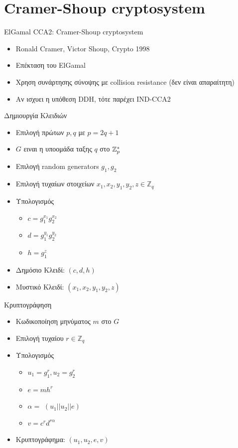 \documentclass[handout]{beamer}
\begin{document}
\section{Cramer-Shoup cryptosystem}
\begin{frame}[allowframebreaks]{ElGamal CCA2: Cramer-Shoup cryptosystem}
\begin{itemize}
\item Ronald Cramer, Victor Shoup, Crypto 1998
\item Επέκταση του ElGamal
\item Χρηση συνάρτησης σύνοψης \hash με collision resistance  (δεν είναι απαραίτητη)
\item Αν ισχυει η υπόθεση DDH, τότε παρέχει IND-CCA2
\end{itemize}

\begin{block}{Δημιουργία Κλειδιών}
\begin{itemize}
\item Επιλογή πρώτων $p,q$ με $p=2q+1$
\item $G$ ειναι η υποομάδα ταξης $q$ στο $\mathbb{Z}^*_p$
\item Επιλογή random generators $g_1, g_2$

\item Επιλογή τυχαίων στοιχείων $x_1,x_2,y_1,y_2,z \in \mathbb{Z}_{q}$
\item Υπολογισμός
\begin{itemize} 
\item $c=g_1^{x_1}g_2^{x_2}$
\item $d=g_1^{y_1}g_2^{y_2}$
\item $h=g_1^{z}$
\end{itemize}
\item Δημόσιο Κλειδί: $(c,d,h)$
\item Μυστικό Κλειδί: $(x_1,x_2,y_1,y_2,z)$
\end{itemize}
\end{block}

\framebreak

\begin{block}{Κρυπτογράφηση}
\begin{itemize}
\item Κωδικοποίηση μηνύματος $m$ στο $G$
\item Επιλογή τυχαίου $r \in \mathbb{Z}_{q}$
\item Υπολογισμός
\begin{itemize} 
\item $u_1 = g_1^r,u_2 = g_2^r$
\item $e = m h^r$
\item $\alpha = $ \hash$(u_1||u_2||e)$
\item $v = c^r d^{r\alpha}$ 
\end{itemize}
\item Κρυπτογράφημα: $(u_1,u_2,e,v)$
\end{itemize}
\end{block}


\end{frame}
\end{document}
